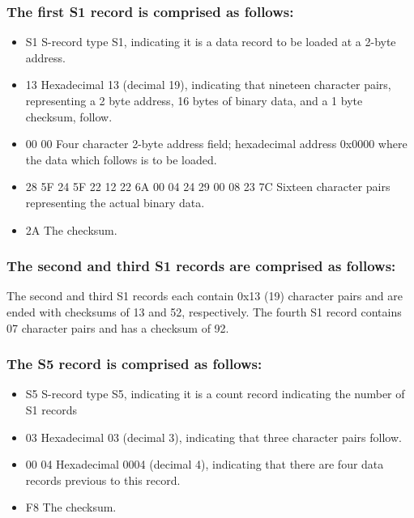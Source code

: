                 \subsubsection{The first S1 record is comprised as follows:}
                    \begin{itemize}
                        \item S1 S-record type S1, indicating it is a data record to be loaded at a 2-byte address.
                        \item 13 Hexadecimal 13 (decimal 19), indicating that nineteen character pairs, representing a 2 byte address, 16 bytes of binary data, and a 1 byte checksum, follow.
                        \item 00 00 Four character 2-byte address field; hexadecimal address 0x0000 where the data which follows is to be loaded.
                        \item 28 5F 24 5F 22 12 22 6A 00 04 24 29 00 08 23 7C Sixteen character pairs representing the actual binary data.
                        \item 2A The checksum.
                    \end{itemize}

                \subsubsection{The second and third S1 records are comprised as follows:}

                    The second and third S1 records each contain 0x13 (19) character pairs
                    and are ended with checksums of 13 and 52, respectively. The fourth S1
                    record contains 07 character pairs and has a checksum of 92.

                \subsubsection{The S5 record is comprised as follows:}
                    \begin{itemize}
                        \item S5 S-record type S5, indicating it is a count record indicating the number of S1 records
                        \item 03 Hexadecimal 03 (decimal 3), indicating that three character pairs follow.
                        \item 00 04 Hexadecimal 0004 (decimal 4), indicating that there are four data records previous to this record.
                        \item F8 The checksum.
                    \end{itemize}
